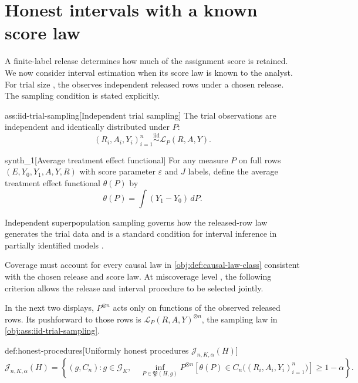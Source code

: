 \section{Honest intervals with a known score law}

A finite-label release determines how much of the assignment score is retained. We now consider interval estimation when its score law is known to the analyst. For trial size , the  observes independent released rows under a chosen release. The sampling condition is stated explicitly.

\begin{assumptionv}{ass:iid-trial-sampling}[Independent trial sampling]
The trial observations are independent and identically distributed under \(P\):
\[
(R_i,A_i,Y_i)_{i=1}^n\stackrel{\mathrm{iid}}{\sim}\mathcal L_P(R,A,Y).
\]
\end{assumptionv}

\begin{definitionv}{synth_1}[Average treatment effect functional]
For any measure \(P\) on full rows \((E,Y_0,Y_1,A,Y,R)\) with score parameter \(\varepsilon\) and \(J\) labels, define the average treatment effect functional \(\theta(P)\) by
\[
\theta(P)=\int (Y_1-Y_0)\,dP.
\]
\end{definitionv}

Independent superpopulation sampling governs how the released-row law generates the trial data and is a standard condition for interval inference in partially identified models \citep{ImbensManski2004}.

Coverage must account for every causal law in \cref{obj:def:causal-law-class} consistent with the chosen release and score law. At miscoverage level , the following criterion allows the release and interval procedure to be selected jointly.

In the next two displays, \(P^{\otimes n}\) acts only on functions of the observed released rows. Its pushforward to those rows is \(\mathcal L_P(R,A,Y)^{\otimes n}\), the sampling law in \cref{obj:ass:iid-trial-sampling}.

\begin{definitionv}{def:honest-procedures}[Uniformly honest procedures $\mathcal J_{n,K,\alpha}(H)$]
\[
\mathcal J_{n,K,\alpha}(H)
=
\left\{
(g,C_n):
g\in\mathcal G_K,\quad
\inf_{P\in\mathfrak P(H,g)}
P^{\otimes n}\!\left[
\theta(P)\in C_n\bigl((R_i,A_i,Y_i)_{i=1}^n\bigr)
\right]
\ge 1-\alpha
\right\}.
\]
\end{definitionv}

